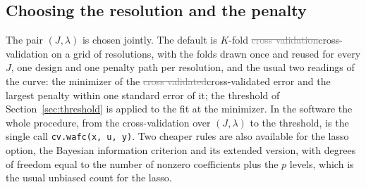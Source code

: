 \documentclass[12pt]{article} %
\theoremstyle{definition}
\theoremstyle{plain}
\newcommand{\pen}{\lambda}
\begin{document}
\subsection{Choosing the resolution and the penalty}
\label{sec:tuning}

The pair $(J,\pen)$ is chosen jointly. The default is $K$\textcolor{colR1}{-}fold \textcolor{gray}{\sout{cross
validation}}\textcolor{colR1}{cross-validation} on a grid of resolutions, with the folds drawn once and reused for
every $J$, one design and one penalty path per resolution, and the usual two
readings of the curve: the minimizer of the \textcolor{gray}{\sout{cross validated}}\textcolor{colR1}{cross-validated} error and the
largest penalty within one standard error of it\textcolor{colR1}{; the threshold
of Section~\ref{sec:threshold} is applied to the fit at the minimizer. In the
software the whole procedure, from the cross-validation over $(J,\pen)$ to the
threshold, is the single call \texttt{cv.wafc(x, u, y)}}. Two cheaper rules are also
available \textcolor{colR1}{for the lasso option}, the Bayesian information criterion and its extended version, with
degrees of freedom equal to the number of nonzero coefficients plus the $p$
levels, which is the usual unbiased count for the lasso.
\end{document}
